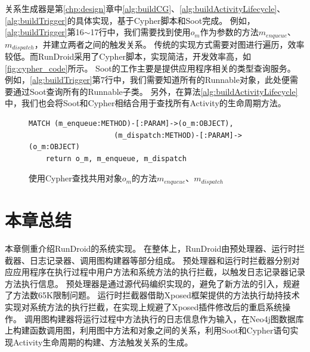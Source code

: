 关系生成器是第\ref{chp:design}章中\autoref{alg:buildCG}、\autoref{alg:buildActivityLifecycle}、\autoref{alg:buildTrigger}的具体实现，基于Cypher脚本和Soot完成。
例如，\autoref{alg:buildTrigger}第16$\sim$17行中，我们需要找到使用$o_{m}$作为参数的方法$m_{enqueue}$、$m_{dispatch}$，并建立两者之间的触发关系。
传统的实现方式需要对图进行遍历，效率较低。而RunDroid采用了Cypher脚本，实现简洁，开发效率高，如\autoref{fig:cypher_code}所示。
Soot的工作主要是提供应用程序相关的类型查询服务。
例如，\autoref{alg:buildTrigger}第7行中，我们需要知道所有的Runnable对象，此处便需要通过Soot查询所有的Runnable子类。
另外，在算法\ref{alg:buildActivityLifecycle}中，我们也会将Soot和Cypher相结合用于查找所有Activity的生命周期方法。


\begin{figure}[!h]
	\centering
	\begin{lstlisting}[style=normal,language=cypher]
	MATCH (m_enqueue:METHOD)-[:PARAM]->(o_m:OBJECT),
					(m_dispatch:METHOD)-[:PARAM]->(o_m:OBJECT)
	return o_m, m_enqueue, m_dispatch\end{lstlisting}
	\caption{使用Cypher查找共用对象$o_m$的方法$m_{enqueue}$、$m_{dispatch}$}
	\label{fig:cypher_code}
\end{figure}


 \section{本章总结}

本章侧重介绍RunDroid的系统实现。
在整体上，RunDroid由预处理器、运行时拦截器、日志记录器、调用图构建器等部分组成。
预处理器和运行时拦截器分别对应应用程序在执行过程中用户方法和系统方法的执行拦截，以触发日志记录器记录方法执行信息。
预处理器是通过源代码编织实现的，避免了新方法的引入，规避了方法数65K限制问题。
运行时拦截器借助Xposed框架提供的方法执行劫持技术实现对系统方法的执行拦截，在实现上规避了Xposed插件修改后的重启系统操作。
调用图构建器将运行过程中方法执行的日志信息作为输入，在Neo4j图数据库上构建函数调用图，利用图中方法和对象之间的关系，利用Soot和Cypher语句实现Activity生命周期的构建、方法触发关系的生成。
